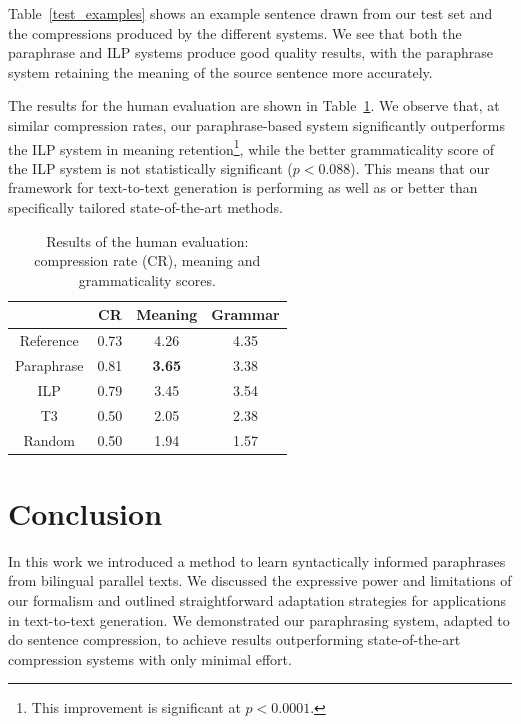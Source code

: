 \documentclass[11pt]{article}
\begin{document}
Table~\ref{test_examples} shows an example sentence drawn from our
test set and the compressions produced by the different systems. We
see that both the paraphrase and ILP systems produce good quality
results, with the paraphrase system retaining the meaning of the
source sentence more accurately.

The results for the human evaluation are shown in
Table~\ref{human_judgments}. We observe that, at similar compression
rates, our paraphrase-based system significantly outperforms the ILP
system in meaning retention\footnote{This improvement is significant
  at $p < 0.0001$.}, while the better grammaticality score of the ILP
system is not statistically significant ($p < 0.088$). This means that
our framework for text-to-text generation is performing as well as or
better than specifically tailored state-of-the-art methods.

\begin{table}
\small
\begin{center}
\begin{tabular}{|c|c|c|c|}
  \hline
  & CR & Meaning & Grammar \\
  \hline
  Reference & 0.73 &  4.26 & 4.35 \\
  Paraphrase & 0.81 & {\bf 3.65} & 3.38 \\
  ILP & 0.79 & 3.45 & 3.54 \\
  T3 & 0.50 & 2.05 & 2.38 \\
  Random & 0.50 & 1.94 & 1.57 \\
  \hline
\end{tabular}
\end{center}
\normalsize
\caption{Results of the human evaluation: compression rate (CR),
  meaning and grammaticality scores. 
  }
\label{human_judgments}
\end{table}



\section{Conclusion} \label{conclusion}

In this work we introduced a method to learn syntactically informed
paraphrases from bilingual parallel texts. We discussed the expressive
power and limitations of our formalism and outlined straightforward
adaptation strategies for applications in text-to-text generation. We
demonstrated our paraphrasing system, adapted to do sentence
compression, to achieve results outperforming state-of-the-art
compression systems with only minimal effort.




\end{document}
